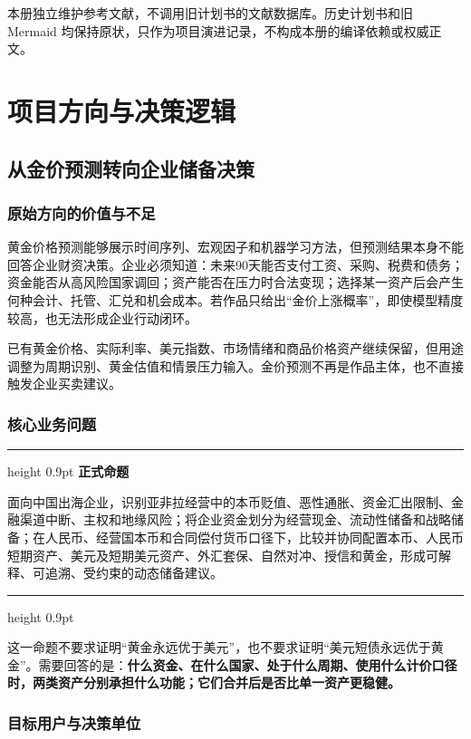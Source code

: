 \documentclass[UTF8,fontset=windows,12pt,openany]{ctexbook}
\newenvironment{decisionbox}[1][]{%
  \par\medskip\noindent\begin{center}\begin{minipage}{0.92\textwidth}%
  \color{OceanBlue}\hrule height 0.9pt\vspace{0.45em}%
  \textbf{#1}\par\smallskip\color{black}%
}{%
  \par\vspace{0.35em}\color{OceanBlue}\hrule height 0.9pt%
  \end{minipage}\end{center}\medskip%
}
\begin{document}
本册独立维护参考文献，不调用旧计划书的文献数据库。历史计划书和旧 Mermaid 均保持原状，只作为项目演进记录，不构成本册的编译依赖或权威正文。

\tableofcontents

\mainmatter

\part{项目方向与决策逻辑}

\chapter{从金价预测转向企业储备决策}

\section{原始方向的价值与不足}

黄金价格预测能够展示时间序列、宏观因子和机器学习方法，但预测结果本身不能回答企业财资决策。企业必须知道：未来90天能否支付工资、采购、税费和债务；资金能否从高风险国家调回；资产能否在压力时合法变现；选择某一资产后会产生何种会计、托管、汇兑和机会成本。若作品只给出“金价上涨概率”，即使模型精度较高，也无法形成企业行动闭环。

已有黄金价格、实际利率、美元指数、市场情绪和商品价格资产继续保留，但用途调整为周期识别、黄金估值和情景压力输入。金价预测不再是作品主体，也不直接触发企业买卖建议。

\section{核心业务问题}

\begin{decisionbox}[正式命题]
面向中国出海企业，识别亚非拉经营中的本币贬值、恶性通胀、资金汇出限制、金融渠道中断、主权和地缘风险；将企业资金划分为经营现金、流动性储备和战略储备；在人民币、经营国本币和合同偿付货币口径下，比较并协同配置本币、人民币短期资产、美元及短期美元资产、外汇套保、自然对冲、授信和黄金，形成可解释、可追溯、受约束的动态储备建议。
\end{decisionbox}

这一命题不要求证明“黄金永远优于美元”，也不要求证明“美元短债永远优于黄金”。需要回答的是：\textbf{什么资金、在什么国家、处于什么周期、使用什么计价口径时，两类资产分别承担什么功能；它们合并后是否比单一资产更稳健。}

\section{目标用户与决策单位}
\end{document}
